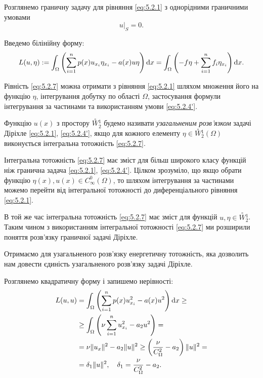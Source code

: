 Розглянемо граничну задачу для рівняння \eqref{eq:5.2.1} з однорідними граничними умовами
\begin{equation}
    \label{eq:5.2.4'}
    \left. u \right|_S = 0.
\end{equation}

Введемо білінійну форму:
\begin{equation}
    \label{eq:5.2.7}
    L(u, \eta) := \int_\Omega \left( \sum_{i=1}^n p(x) u_{x_i} \eta_{x_i} - a(x)u\eta \right) \mathop{}\!\mathrm{d} x = \int_\Omega \left( -f\eta + \sum_{i=1}^n f_i \eta_{x_i} \right) \mathop{}\!\mathrm{d} x.
\end{equation}

Рівність \eqref{eq:5.2.7} можна отримати з рівняння \eqref{eq:5.2.1} шляхом множення його на функцію $\eta$, інтегрування добутку по області $\Omega$, застосування формули інтегрування за частинами та використанням умови \eqref{eq:5.2.4'}.

\begin{definition}
    Функцію $u(x)$ з простору $\overset{\circ}{W} {}_2^1$ будемо називати \emph{узагальненим розв'язком} задачі Діріхле \eqref{eq:5.2.1}, \eqref{eq:5.2.4'}, якщо для кожного елементу $\eta \in \overset{\circ}{W} {}_2^1(\Omega)$ виконується інтегральна тотожність \eqref{eq:5.2.7}.
\end{definition}

Інтегральна тотожність \eqref{eq:5.2.7} має зміст для більш широкого класу функцій ніж гранична задача \eqref{eq:5.2.1}, \eqref{eq:5.2.4'}. Цілком зрозуміло, що якщо обрати функцію $\eta(x), u(x) \in C_\infty^0(\Omega)$, то шляхом інтегрування за частинами можемо перейти від інтегральної тотожності до диференціального рівняння \eqref{eq:5.2.1}. \medskip

В той же час інтегральна тотожність \eqref{eq:5.2.7} має зміст для функцій $u, \eta \in \overset{\circ}{W} {}_2^1$. Таким чином з використанням інтегральної тотожності \eqref{eq:5.2.7} ми розширили поняття розв'язку граничної задачі Діріхле. \medskip

Отримаємо для узагальненого розв'язку енергетичну тотожність, яка дозволить нам довести єдиність узагальненого розв'язку задачі Діріхле. \medskip

Розглянемо квадратичну форму і запишемо нерівності:
\begin{equation}
    \label{eq:5.2.8}
    \begin{aligned}
        L(u,u)
        &= \int_\Omega \left( \sum_{i=1}^n p(x) u_{x_i}^2 - a(x) u^2 \right) \mathop{}\!\mathrm{d} x \ge \\
        &\ge \int_\Omega \left( \nu \sum_{i=1}^n u_{x_i}^2 - a_2 u^2 \right) = \\
        &= \nu \|u_x\|^2 - a_2 \|u\|^2 \ge \left( \frac{\nu}{C_\Omega^2} - a_2\right) \|u\|^2 = \\
        &= \delta_1 \|u\|^2, \quad \delta_1 = \frac{\nu}{C_\Omega^2} - a_2.
    \end{aligned}
\end{equation}

